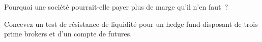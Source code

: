 \begin{interviewq}\label{iq:fm:treasury-and-funding:5}
Pourquoi une société pourrait-elle payer plus de marge qu'il n'en faut~?
\end{interviewq}

\begin{interviewq}\label{iq:fm:treasury-and-funding:6}
Concevez un test de résistance de liquidité pour un hedge fund disposant de trois prime brokers et d'un compte de futures.
\end{interviewq}
